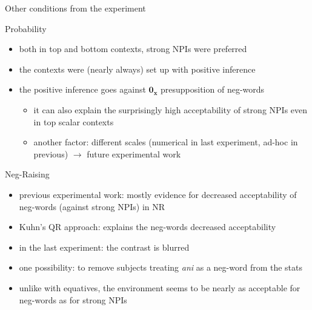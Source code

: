 \documentclass[
  ignorenonframetext,
]{beamer}
\providecommand{\tightlist}{%
  \setlength{\itemsep}{0pt}\setlength{\parskip}{0pt}}\usepackage{longtable,booktabs,array}
\begin{document}
\begin{frame}
\begin{block}{Other conditions from the experiment}
\protect\hypertarget{other-conditions-from-the-experiment-1}{}
\begin{block}{Probability}
\protect\hypertarget{probability}{}
\begin{itemize}
\tightlist
\item
  both in top and bottom contexts, strong NPIs were preferred
\item
  the contexts were (nearly always) set up with positive inference
\item
  the positive inference goes against \(\mathbf{0_x}\) presupposition of
  neg-words

  \begin{itemize}
  \tightlist
  \item
    it can also explain the surprisingly high acceptability of strong
    NPIs even in top scalar contexts
  \item
    another factor: different scales (numerical in last experiment,
    ad-hoc in previous) \(\rightarrow\) future experimental work
  \end{itemize}
\end{itemize}
\end{block}
\end{block}
\end{frame}

\begin{frame}
\begin{block}{Neg-Raising}
\protect\hypertarget{neg-raising-1}{}
\begin{itemize}
\tightlist
\item
  previous experimental work: mostly evidence for decreased
  acceptability of neg-words (against strong NPIs) in NR
\item
  Kuhn's QR approach: explains the neg-words decreased acceptability
\item
  in the last experiment: the contrast is blurred
\item
  one possibility: to remove subjects treating \emph{ani} as a neg-word
  from the stats
\item
  unlike with equatives, the environment seems to be nearly as
  acceptable for neg-words as for strong NPIs
\end{itemize}
\end{block}
\end{frame}
\end{document}
